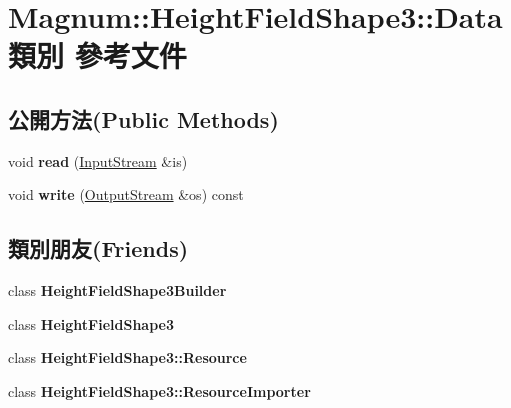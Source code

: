 \hypertarget{class_magnum_1_1_height_field_shape3_1_1_data}{}\section{Magnum\+:\+:Height\+Field\+Shape3\+:\+:Data 類別 參考文件}
\label{class_magnum_1_1_height_field_shape3_1_1_data}
\subsection*{公開方法(Public Methods)}
\begin{DoxyCompactItemize}
\item 
void {\bfseries read} (\hyperlink{class_magnum_1_1_input_stream}{Input\+Stream} \&is)\hypertarget{class_magnum_1_1_height_field_shape3_1_1_data_a8b7ed5a89146bb26fcd8d4fdee3ff8ba}{}\label{class_magnum_1_1_height_field_shape3_1_1_data_a8b7ed5a89146bb26fcd8d4fdee3ff8ba}

\item 
void {\bfseries write} (\hyperlink{class_magnum_1_1_output_stream}{Output\+Stream} \&os) const \hypertarget{class_magnum_1_1_height_field_shape3_1_1_data_a9d04c01bfa08c646a52327dbf9ce9965}{}\label{class_magnum_1_1_height_field_shape3_1_1_data_a9d04c01bfa08c646a52327dbf9ce9965}

\end{DoxyCompactItemize}
\subsection*{類別朋友(Friends)}
\begin{DoxyCompactItemize}
\item 
class {\bfseries Height\+Field\+Shape3\+Builder}\hypertarget{class_magnum_1_1_height_field_shape3_1_1_data_ad601eb47f5c3430dca8c88f9dd93b2da}{}\label{class_magnum_1_1_height_field_shape3_1_1_data_ad601eb47f5c3430dca8c88f9dd93b2da}

\item 
class {\bfseries Height\+Field\+Shape3}\hypertarget{class_magnum_1_1_height_field_shape3_1_1_data_ab808f8979681967b9d908bfe30f4841b}{}\label{class_magnum_1_1_height_field_shape3_1_1_data_ab808f8979681967b9d908bfe30f4841b}

\item 
class {\bfseries Height\+Field\+Shape3\+::\+Resource}\hypertarget{class_magnum_1_1_height_field_shape3_1_1_data_a489733af8b1e9cab1ee9700c1f619014}{}\label{class_magnum_1_1_height_field_shape3_1_1_data_a489733af8b1e9cab1ee9700c1f619014}

\item 
class {\bfseries Height\+Field\+Shape3\+::\+Resource\+Importer}\hypertarget{class_magnum_1_1_height_field_shape3_1_1_data_a42ac71e9d35461ef687afa596057b1a9}{}\label{class_magnum_1_1_height_field_shape3_1_1_data_a42ac71e9d35461ef687afa596057b1a9}

\end{DoxyCompactItemize}


